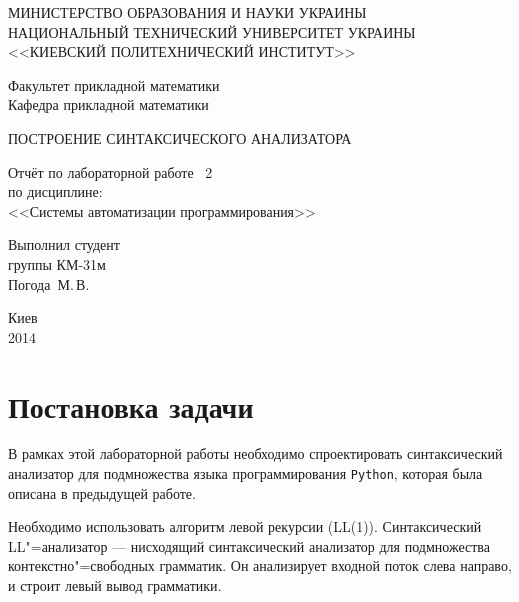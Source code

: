 \documentclass[a4paper,10pt,notitlepage,pdftex]{scrreprt}
\begin{document}
\begin{titlepage}
    \begin{center}
        \MakeUppercase{Министерство образования и науки Украины}\\
        \MakeUppercase{Национальный технический университет Украины}\\
        \MakeUppercase{<<Киевский политехнический институт>>}\\
        \vspace*{2em}

        Факультет прикладной математики\\
        Кафедра прикладной математики

        \vfill

        \MakeUppercase{Построение синтаксического анализатора}\\
        \vspace*{2em}

        Отчёт по лабораторной работе \textnumero~2\\
        по дисциплине:\\
        <<Системы автоматизации программирования>>
    \end{center}

    \vfill
    \hfill\begin{minipage}{0.3\textwidth}
        Выполнил студент\\
        группы КМ-31м\\
        Погода~М.\,В.
    \end{minipage}

    \vfill
    \begin{center}
        Киев\\
        2014
    \end{center}
\end{titlepage}

\tableofcontents

\chapter{Постановка задачи}
\label{chap:first}
    В рамках этой лабораторной работы необходимо спроектировать синтаксический анализатор для подмножества языка
    программирования \texttt{Python}, которая была описана в предыдущей работе.

    Необходимо использовать алгоритм левой рекурсии (LL(1)).
    Синтаксический LL"=анализатор --- нисходящий синтаксический анализатор для подмножества контекстно"=свободных
    грамматик.
    Он анализирует входной поток слева направо, и строит левый вывод грамматики.
\end{document}
